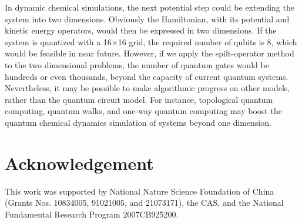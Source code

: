 \documentclass[8.5pt,twoside,twocolumn]{article}
\begin{document}
In dynamic chemical simulations,
the next potential step could be extending the system
into two dimensions. Obviously the Hamiltonian,
with its potential and kinetic energy operators,
would then be expressed in two dimensions.
If the system is quantized with a 16$\times$16 grid,
the required number of qubits is 8,
which would be feasible in near future.
However, if we apply the spilt-operator method\cite{Trotter_1,Trotter_2}
to the two dimensional problems, the number of quantum gates
would be hundreds or even thousands,
beyond the capacity of current quantum systems.
Nevertheless, it may be possible to make algorithmic progress
on other models, rather than the quantum circuit model.
For instance, topological quantum computing,\cite{topological_quantum_computing_1,topological_quantum_computing_2}
quantum walks,\cite{quantum_walks_1,quantum_walks_2,quantum_walks_3,quantum_walks_4}
and one-way quantum computing\cite{one-way_quantum_computing_1,one-way_quantum_computing_2,one-way_quantum_computing_3}
may boost the quantum chemical dynamics simulation of systems
beyond one dimension.

\section{Acknowledgement}

This work was supported by National Nature Science Foundation of
China (Grants Nos. 10834005, 91021005, and 21073171), the CAS, and the National Fundamental Research Program 2007CB925200.



\end{document}

